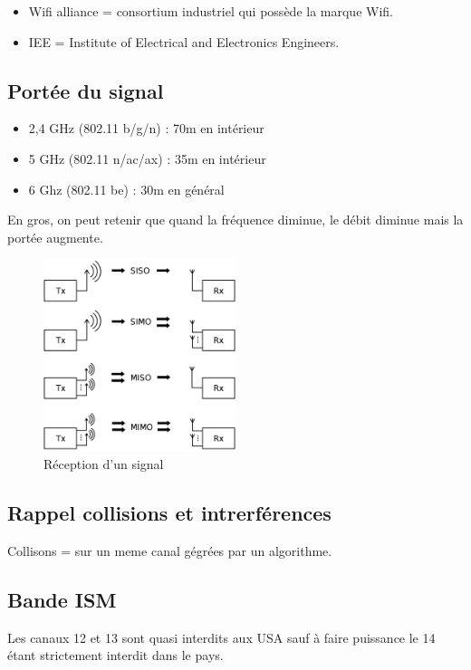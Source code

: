 \documentclass[12pt, a4paper]{article}
\begin{document}
\begin{itemize}
    \item Wifi alliance = consortium industriel qui possède la marque Wifi.
    \item IEE = Institute of Electrical and Electronics Engineers.
\end{itemize}
\newpage
\subsection{Portée du signal}

\begin{itemize}
    \item 2,4 GHz (802.11 b/g/n) : 70m en intérieur
    \item 5 GHz (802.11 n/ac/ax) : 35m en intérieur 
    \item 6 Ghz (802.11 be) : 30m en général \\
\end{itemize}

En gros, on peut retenir que quand la fréquence diminue, le débit diminue mais
la portée augmente. 

\begin{figure}[H]
    \centering
    \includegraphics[width=0.5\textwidth]{img/rx.png}
    \caption{Réception d'un signal}
    \label{fig:schema}
\end{figure}

\subsection{Rappel collisions et intrerférences}
Collisons = sur un meme canal gégrées par un algorithme. 

\subsection{Bande ISM}
Les canaux 12 et 13 sont quasi interdits aux USA sauf à faire puissance le 14 étant
strictement interdit dans le pays.
\end{document}
